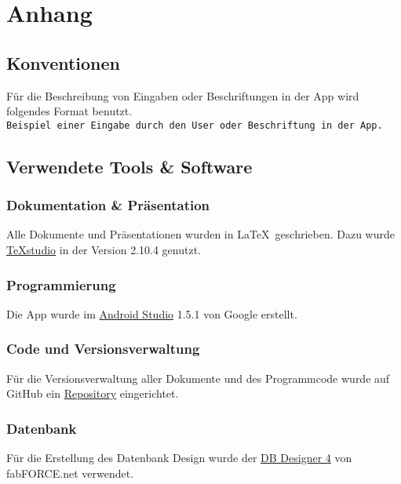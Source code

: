 \chapter{Anhang}

\section{Konventionen}

Für die Beschreibung von Eingaben oder Beschriftungen in der App wird folgendes Format benutzt. \\
{\color{IndianRed}\texttt{Beispiel einer Eingabe durch den User oder Beschriftung in der App.}}

\section{Verwendete Tools \& Software}

\subsection{Dokumentation \& Präsentation}

Alle Dokumente und Präsentationen wurden in \LaTeX \ geschrieben. Dazu wurde \href{http://texstudio.sourceforge.net}{TeXstudio} in der Version 2.10.4 genutzt. 

\subsection{Programmierung}

Die App wurde im \href{https://developer.android.com/studio/index.html}{Android Studio} 1.5.1 von Google erstellt.

\subsection{Code und Versionsverwaltung}

Für die Versionsverwaltung aller Dokumente und des Programmcode wurde auf GitHub ein \href{https://github.com/MWeigert/Collector}{Repository} eingerichtet.

\subsection{Datenbank}

Für die Erstellung des Datenbank Design wurde der \href{http://fabforce.net/dbdesigner4/}{DB Designer 4} von fabFORCE.net verwendet.

